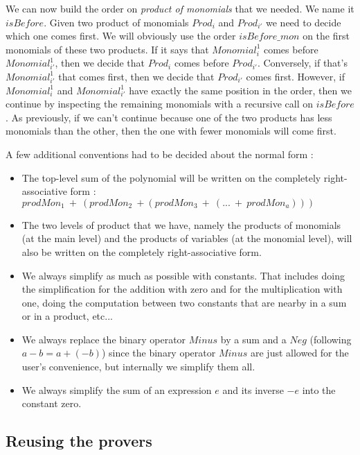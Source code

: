 We can now build the order on \emph{product of monomials} that we needed. We name it $isBefore$. Given two product of monomials $Prod_{i}$ and $Prod_{i'}$ we need to decide which one comes first. We will obviously use the order $isBefore\_mon$ on the first monomials of these two products. If it says that $Monomial_{i}^{1}$ comes before $Monomial_{i'}^{1}$, then we decide that $Prod_{i}$ comes before $Prod_{i'}$. Conversely, if that's $Monomial_{i'}^{1}$ that comes first, then we decide that $Prod_{i'}$ comes first. However, if $Monomial_{i}^{1}$ and $Monomial_{i'}^{1}$ have exactly the same position in the order, then we continue by inspecting the remaining monomials with a recursive call on $isBefore$. As previously, if we can't continue because one of the two products has less monomials than the other, then the one with fewer monomials will come first.

A few additional conventions had to be decided about the normal form :
\begin{itemize}

\item The top-level sum of the polynomial will be written on the completely right-associative form : \\
$prodMon_1\ +\ (prodMon_2\ + (prodMon_3\ +\ (...\ +\ prodMon_a)))$
\item The two levels of product that we have, namely the products of monomials (at the main level) and the products of variables (at the monomial level), will also be written on the completely right-associative form.
\item We always simplify as much as possible with constants. That includes doing the simplification for the addition with zero and for the multiplication with one, doing the computation between two constants that are nearby in a sum or in a product, etc...
\item We always replace the binary operator $Minus$ by a sum and a $Neg$ (following $a-b=a+(-b)$) since the binary operator $Minus$ are just allowed for the user's convenience, but internally we simplify them all.
\item We always simplify the sum of an expression $e$ and its inverse $-e$ into the constant zero. 

\end{itemize}

\subsection{Reusing the provers}
\label{sect:reusabilityOfTheProvers}

